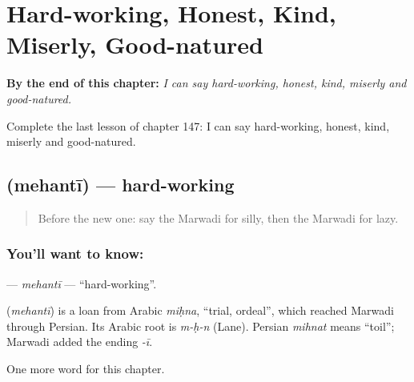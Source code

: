 
\chapter{Hard-working, Honest, Kind, Miserly, Good-natured}
\label{ch:mw-hard-working-honest-kind-miserly-good-natured}

\begin{chapteropening}
\textbf{By the end of this chapter:} \emph{I can say hard-working, honest, kind, miserly and good-natured.}

Complete the last lesson of chapter 147: I can say hard-working, honest, kind, miserly and good-natured.
\end{chapteropening}

\section[\texorpdfstring{\mw{मेहनती} (mehantī)}{मेहनती (mehantī)}]{ (mehantī) — hard-working}

\label{lesson:MW-C147-mehanti}



\begin{quote}
Before the new one: say the Marwadi for silly, then the Marwadi for lazy.
\end{quote}

\subsection*{You'll want to know: }
\textbf{} — \emph{mehantī} — \textquotedblleft{}hard-working\textquotedblright{}.

\begin{cousinweb}
\textbf{} (\emph{mehantī}) is a loan from Arabic \emph{miḥna}, \textquotedblleft{}trial, ordeal\textquotedblright{}, which reached Marwadi through Persian. Its Arabic root is \emph{m-ḥ-n} (Lane). Persian \emph{mihnat} means \textquotedblleft{}toil\textquotedblright{}; Marwadi added the ending \emph{-ī}.
\end{cousinweb}

\begin{grammarlens}[title={What you've built}]
One more word for this chapter.
\end{grammarlens}


